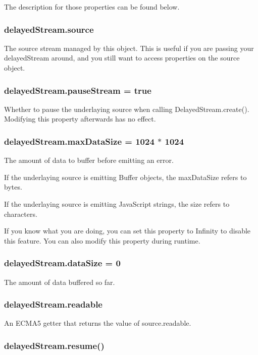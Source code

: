 The description for those properties can be found below.

\subsubsection*{delayed\+Stream.\+source}

The {\ttfamily source} stream managed by this object. This is useful if you are passing your {\ttfamily delayed\+Stream} around, and you still want to access properties on the {\ttfamily source} object.

\subsubsection*{delayed\+Stream.\+pause\+Stream = true}

Whether to pause the underlaying {\ttfamily source} when calling {\ttfamily Delayed\+Stream.\+create()}. Modifying this property afterwards has no effect.

\subsubsection*{delayed\+Stream.\+max\+Data\+Size = 1024 $\ast$ 1024}

The amount of data to buffer before emitting an {\ttfamily error}.

If the underlaying source is emitting {\ttfamily Buffer} objects, the {\ttfamily max\+Data\+Size} refers to bytes.

If the underlaying source is emitting Java\+Script strings, the size refers to characters.

If you know what you are doing, you can set this property to {\ttfamily Infinity} to disable this feature. You can also modify this property during runtime.

\subsubsection*{delayed\+Stream.\+data\+Size = 0}

The amount of data buffered so far.

\subsubsection*{delayed\+Stream.\+readable}

An E\+C\+M\+A5 getter that returns the value of {\ttfamily source.\+readable}.

\subsubsection*{delayed\+Stream.\+resume()}

